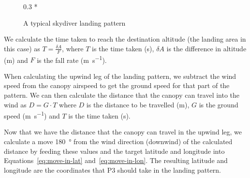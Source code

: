 \begin{figure}[ht]
  \centering
  \begin{scaletikzpicturetowidth}{0.3 * \linewidth}
  \end{scaletikzpicturetowidth}
  \caption{A typical skydiver landing pattern}\label{fig:pattern-generation}
\end{figure}

We calculate the time taken to reach the destination altitude (the landing area in this case) as $T = \frac{\delta A}{F}$, where $T$ is the time taken (\si{\second}), $\delta A$ is the difference in altitude (\si{\metre}) and $F$ is the fall rate (\si{\metre\per\second}).

When calculating the upwind leg of the landing pattern, we subtract the wind speed from the canopy airspeed to get the ground speed for that part of the pattern. We can then calculate the distance that the canopy can travel into the wind as $D = G \cdot T$ where $D$ is the distance to be travelled (\si{\metre}), $G$ is the ground speed (\si{\metre\per\second}) and $T$ is the time taken (\si{\second}).

Now that we have the distance that the canopy can travel in the upwind leg, we calculate a move \SI{180}{\degree} from the wind direction (downwind) of the calculated distance by feeding these values and the target latitude and longitude into Equations~\ref{eq:move-in-lat} and~\ref{eq:move-in-lon}. The resulting latitude and longitude are the coordinates that P3 should take in the landing pattern.

